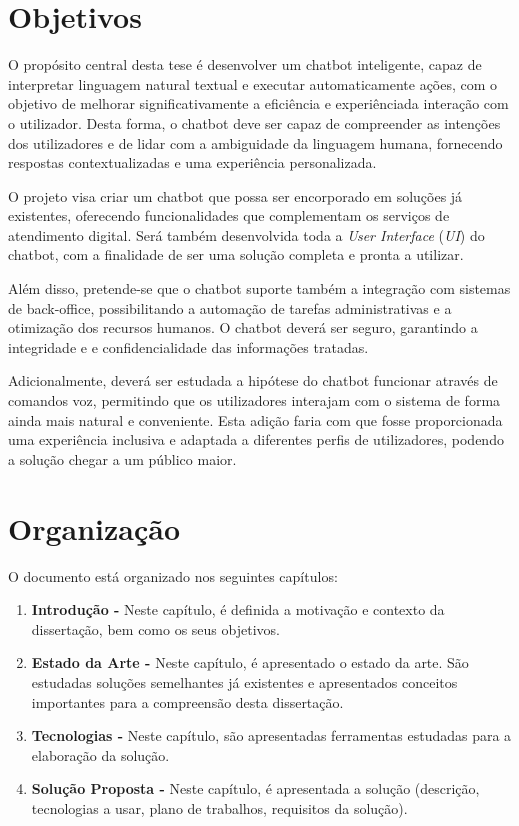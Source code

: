 \section{Objetivos}
\label{sec:objetivos}

O propósito central desta tese é desenvolver um chatbot inteligente, capaz de interpretar linguagem natural textual e executar automaticamente ações, com o objetivo de melhorar
significativamente a eficiência e experiênciada interação com o utilizador. Desta forma, o chatbot deve ser capaz de compreender as intenções dos utilizadores e de 
lidar com a ambiguidade da linguagem humana, fornecendo respostas contextualizadas e uma experiência personalizada. 

O projeto visa criar um chatbot que possa ser encorporado em soluções já existentes, oferecendo funcionalidades que complementam os serviços de atendimento digital.
Será também desenvolvida toda a \textit{User Interface} (\textit{UI}) do chatbot, com a finalidade de ser uma solução completa e pronta a utilizar. 

Além disso, pretende-se que o chatbot suporte também a integração com sistemas de back-office, possibilitando a automação de tarefas administrativas e a otimização
dos recursos humanos. O chatbot deverá ser seguro, garantindo a integridade e e confidencialidade das informações tratadas.

Adicionalmente, deverá ser estudada a hipótese do chatbot funcionar através de comandos voz, permitindo que os utilizadores interajam com o sistema de forma ainda mais
natural e conveniente. Esta adição faria com que fosse proporcionada uma experiência inclusiva e adaptada a diferentes perfis de utilizadores, podendo a solução chegar
a um público maior.

\section{Organização}
\label{sec:organization}

O documento está organizado nos seguintes capítulos:
\begin{enumerate}
  \item \textbf{Introdução - } Neste capítulo, é definida a motivação e contexto da dissertação, bem como os seus objetivos.
  \item \textbf{Estado da Arte - } Neste capítulo, é apresentado o estado da arte. São estudadas soluções semelhantes já existentes e apresentados conceitos importantes para a compreensão desta dissertação.
  \item \textbf{Tecnologias - } Neste capítulo, são apresentadas ferramentas estudadas para a elaboração da solução.   
  \item \textbf{Solução Proposta - } Neste capítulo, é apresentada a solução (descrição, tecnologias a usar, plano de trabalhos, requisitos da solução).
\end{enumerate}

